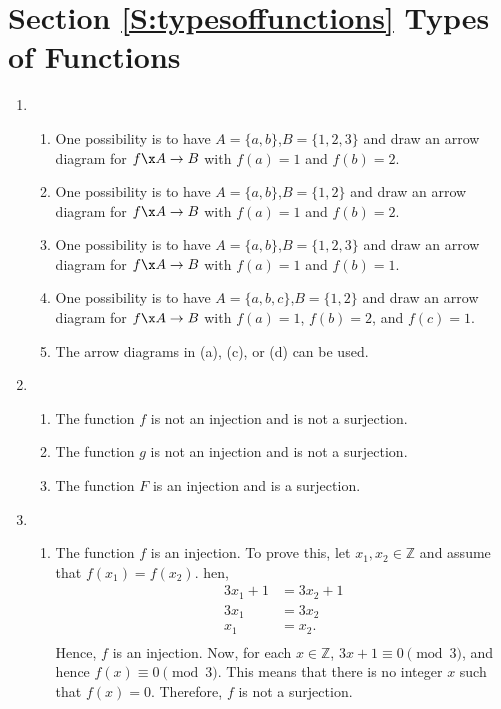 \section*{Section \ref{S:typesoffunctions} Types of Functions}

\begin{enumerate}
\item \begin{enumerate}
\item One possibility is to have $A = \{a, b \}$,$B = \{ 1, 2, 3 \}$ and draw an arrow diagram for $f\x A \to B$ with $f(a) = 1$ and $f(b) = 2$.

\item One possibility is to have $A = \{a, b \}$,$B = \{ 1, 2 \}$ and draw an arrow diagram for $f\x A \to B$ with $f(a) = 1$ and $f(b) = 2$.

\item One possibility is to have $A = \{a, b \}$,$B = \{ 1, 2, 3 \}$ and draw an arrow diagram for $f\x A \to B$ with $f(a) = 1$ and $f(b) = 1$.

\item One possibility is to have $A = \{a, b, c \}$,$B = \{ 1, 2 \}$ and draw an arrow diagram for $f\x A \to B$ with $f(a) = 1$, $f(b) = 2$, and $f(c) = 1$.

\item The arrow diagrams in (a), (c), or (d) can be used.
\end{enumerate}


\item \begin{enumerate}
\item The function $f$ is not an injection and is not a surjection.

\item The function $g$ is not an injection and is not a surjection.

\item The function $F$ is an injection and is a surjection.
\end{enumerate}


\item \begin{enumerate}
\item The function $f$ is an injection.  To prove this, let $x_1, x_2 \in \mathbb{Z}$ and assume that $f ( x_1 ) = f ( x_2 )$.  hen,
\[
\begin{aligned}
3x_1 + 1 &= 3x_2 + 1 \\
    3x_1 &= 3x_2 \\
     x_1 &= x_2. \\
\end{aligned}
\]
Hence, $f$ is an injection.  Now, for each $x \in \mathbb{Z}$, $3x + 1 \equiv 0 \pmod 3$, and hence 
$f ( x ) \equiv 0 \pmod 3$.  This means that there is no integer $x$ such that 
$f ( x ) = 0$.  Therefore, $f$ is not a surjection.


\end{enumerate}
\end{enumerate}
